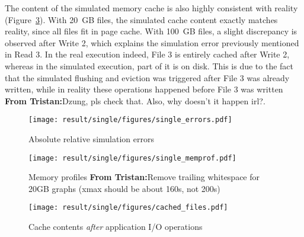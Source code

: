 \documentclass[conference]{IEEEtran}
\newcommand{\tristan}[1]{\color{orange}\textbf{From Tristan:}#1\color{black}}
\begin{document}
        The content of the simulated memory cache is also highly consistent
        with reality (Figure~\ref{fig:single_cache}). With 20~GB files, the
        simulated cache content exactly matches reality, since all files fit in page cache. With 100~GB files, a slight
        discrepancy is observed after Write 2, which explains the
        simulation error previously mentioned in Read 3. In the real execution indeed,
        File 3 is entirely cached after Write 2, whereas in the simulated execution, part
        of it is on disk. This is due to the fact that the simulated flushing and eviction
        was triggered after File 3 was already written, while in reality these operations
        happened before File 3 was written \tristan{Dzung, pls check that. Also, why doesn't it happen irl?}.


            \begin{figure*}
            \centering
            \begin{subfigure}{\linewidth}
                \centering
                   \texttt{[image: result/single/figures/single\_errors.pdf]}
                   \vspace*{-0.7cm}
                   \caption{Absolute relative simulation errors}
                   \vspace*{0.5cm}
                   \label{fig:single_error}
                \end{subfigure}
            \begin{subfigure}{\linewidth}
                \centering
                   \texttt{[image: result/single/figures/single\_memprof.pdf]}
                   \vspace*{-0.7cm}
                   \caption{Memory profiles \tristan{Remove trailing whitespace for 20GB graphs (xmax should be about 160s, not 200s)}}
                   \vspace*{0.5cm}
                   \label{fig:single_memprof}
            \end{subfigure}
            \begin{subfigure}{\linewidth}
                \centering
                   \texttt{[image: result/single/figures/cached\_files.pdf]}
                   \caption{Cache contents \emph{after} application I/O operations}
                   \label{fig:single_cache}
            \end{subfigure}
            \caption{Single-threaded results}
            \end{figure*}
\end{document}
